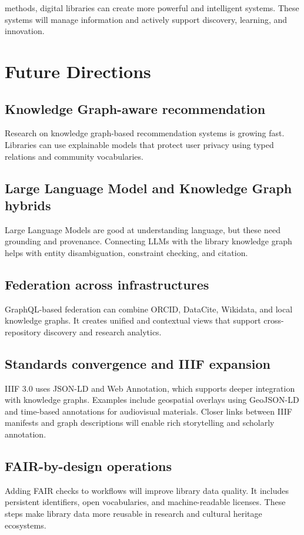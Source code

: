 \documentclass[12pt,a4paper]{article}
\begin{document}
methods, digital libraries can create more powerful and intelligent systems. These systems will manage information and actively support discovery, learning, and innovation.

\section{Future Directions}
\subsection{Knowledge Graph-aware recommendation}
Research on knowledge graph-based recommendation systems is growing fast. Libraries can use explainable models that protect user privacy using typed relations and community vocabularies.

\subsection{Large Language Model and Knowledge Graph hybrids}
Large Language Models are good at understanding language, but these need grounding and provenance. Connecting LLMs with the library knowledge graph helps with entity disambiguation, constraint checking, and citation. 

\subsection{Federation across infrastructures}
GraphQL-based federation can combine ORCID, DataCite, Wikidata, and local knowledge graphs. It creates unified and contextual views that support cross-repository discovery and research analytics.

\subsection{Standards convergence and IIIF expansion}
IIIF 3.0 uses JSON-LD and Web Annotation, which supports deeper integration with knowledge graphs. Examples include geospatial overlays using GeoJSON-LD and time-based annotations for audiovisual materials. Closer links between IIIF manifests and graph descriptions will enable rich storytelling and scholarly annotation.

\subsection{FAIR-by-design operations}
Adding FAIR checks to workflows will improve library data quality. It includes persistent identifiers, open vocabularies, and machine-readable licenses. These steps make library data more reusable in research and cultural heritage ecosystems.
\end{document}
